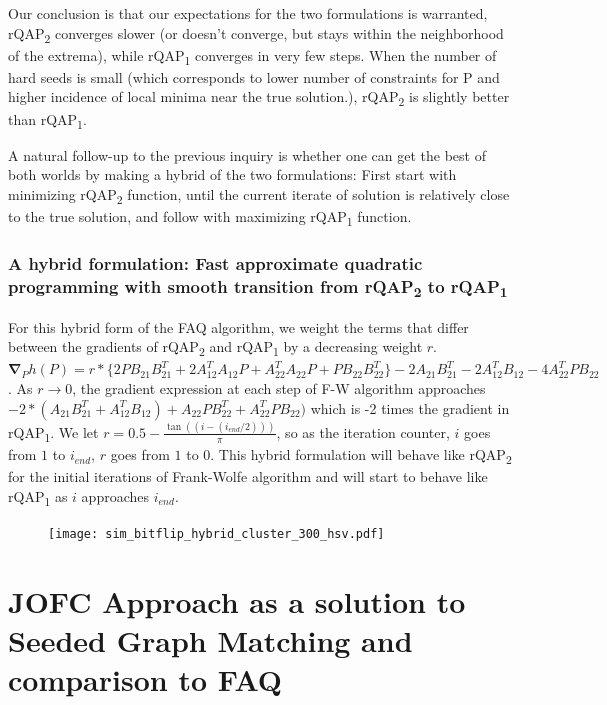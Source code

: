 \documentclass[12pt,oneside,final]{thesis}
\begin{document}
Our conclusion is that our expectations for the two formulations is warranted, rQAP\textsubscript{2}   converges slower (or doesn't converge, but stays within the neighborhood of the extrema), while rQAP\textsubscript{1} converges in very few steps. When the number of hard seeds is small (which corresponds to lower number of constraints for P and higher incidence of local minima near the true solution.), rQAP\textsubscript{2} is slightly better than rQAP\textsubscript{1}.


A natural follow-up to the previous inquiry is whether one can get the best of both worlds by making a hybrid of the two formulations: First start with minimizing rQAP\textsubscript{2} function, until the current iterate of solution is relatively close to the true solution, and follow with maximizing rQAP\textsubscript{1} function. 


\subsection{A hybrid formulation: Fast approximate quadratic programming with smooth transition from rQAP\textsubscript{2} to rQAP\textsubscript{1} \label{subsec:hybrid}}

For this hybrid form of the FAQ algorithm, we weight the terms that differ between the gradients of  rQAP\textsubscript{2} and rQAP\textsubscript{1} by a decreasing weight $r$. $\boldsymbol{\nabla}_{P}h(P)=
r*\{2PB_{21}B_{21}^{T}
+2A_{12}^{T}A_{12}P
+A_{22}^{T}A_{22}P
+PB_{22}B_{22}^{T}\}
-2A_{21}B_{21}^{T}-2A_{12}^{T}B_{12}
-4A_{22}^{T}PB_{22}$. As $r \rightarrow 0 $, the gradient expression at each step of F-W algorithm approaches
$-2*(A_{21}B_{21}^T+A_{12}^TB_{12})+A_{22}PB_{22}^T+A_{22}^TPB_{22})$ which is -2 times the gradient in rQAP\textsubscript{1}. We let $r= 0.5- \frac{\tan((i-(i_{end}/2)))}{\pi}$, so as the iteration counter, $i$ goes from $1$ to $i_{end}$, $r$ goes from $1$ to $0$. This hybrid formulation will behave like rQAP\textsubscript{2} for the initial iterations of Frank-Wolfe algorithm and will start to behave like rQAP\textsubscript{1} as $i$ approaches $i_{end}$.


\begin{figure}
 \centering
  \caption{
 \label{fig:hybrid}}
 \texttt{[image: sim\_bitflip\_hybrid\_cluster\_300\_hsv.pdf]}
\end{figure}



\chapter{JOFC Approach as a solution to Seeded Graph Matching and comparison to FAQ}
\label{sec:sgm-jofc}
\end{document}
